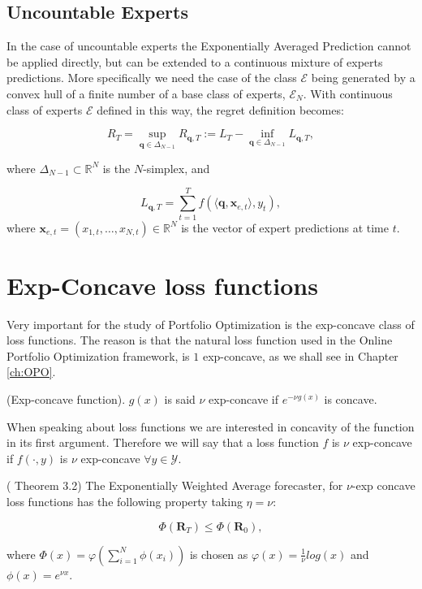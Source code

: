 \subsection{Uncountable Experts}\label{sec:uncountable_exp}

In the case of uncountable experts the Exponentially Averaged Prediction cannot be applied directly, but can be extended to a continuous mixture of experts predictions. More specifically we need the case of the class $\mathcal E$ being generated by a convex hull of a finite number of a base class of experts, $\mathcal E_N$.
With continuous class of experts $\mathcal E$ defined in this way, the regret definition becomes:

\begin{equation}
    R_T = \sup\limits_{\mathbf q\in\Delta_{N-1}}R_{\mathbf q,T}:=L_T-\inf\limits_{\mathbf q\in\Delta_{N-1}}L_{\mathbf q,T},
\end{equation}

where $\Delta_{N-1}\subset \mathbb R^{N}$ is the $N$-simplex, and 

$$L_{\mathbf q,T}=\sum\limits_{t=1}^T f(\langle \mathbf q,\mathbf x_{e,t}\rangle,y_t),$$
where $\mathbf x_{e,t}=(x_{1,t},\ldots,x_{N,t})\in\mathbb R^N$ is the vector of expert predictions at time $t$.


\section{Exp-Concave loss functions}\label{sec:exp-concave-mixture}

Very important for the study of Portfolio Optimization is the exp-concave class of loss functions. The reason is that the natural loss function used in the Online Portfolio Optimization framework, is $1$ exp-concave, as we shall see in Chapter \ref{ch:OPO}.

\begin{definition}(Exp-concave function). 
$g(x)$ is said $\nu$ exp-concave if $e^{-\nu g(x)}$ is concave.
\end{definition}

When speaking about loss functions we are interested in concavity of the function in its first argument. Therefore we will say that a loss function $f$ is $\nu$ exp-concave if $f(\cdot,y)$ is $\nu$ exp-concave $\forall y\in\mathcal Y$. 

\begin{theorem}\label{th:General_Blk}(\cite{cesa2006prediction} Theorem 3.2)
The Exponentially Weighted Average forecaster, for $\nu$-exp concave loss functions has the following property taking $\eta=\nu$:

$$\Phi(\mathbf R_T)\le \Phi(\mathbf R_0),$$

where $\Phi(x)=\varphi\left(\sum\limits_{i=1}^N\phi(x_i)\right)$ is chosen as $\varphi(x)=\frac{1}{\nu}log(x)$ and $\phi(x)=e^{\nu x}.$

\end{theorem}

